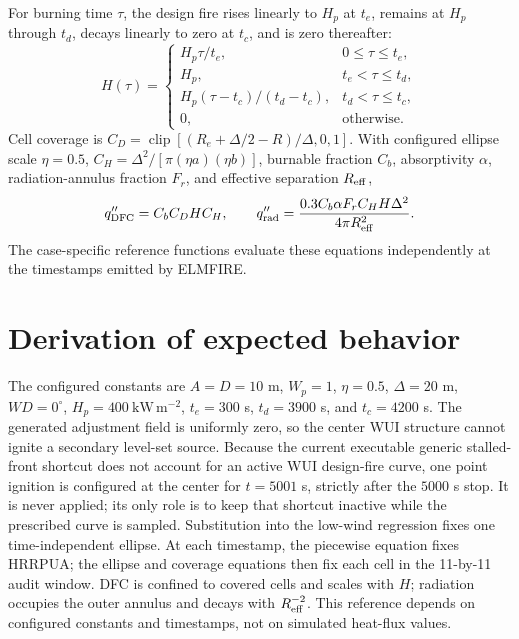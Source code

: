 For burning time \(\tau\), the design fire rises linearly to \(H_p\) at \(t_e\), remains at \(H_p\) through \(t_d\), decays linearly to zero at \(t_c\), and is zero thereafter:
\[
H(\tau)=
\begin{cases}
H_p\tau/t_e,&0\le\tau\le t_e,\\
H_p,&t_e<\tau\le t_d,\\
H_p(\tau-t_c)/(t_d-t_c),&t_d<\tau\le t_c,\\
0,&\text{otherwise}.
\end{cases}
\]
Cell coverage is \(C_D=\operatorname{clip}[(R_e+\Delta/2-R)/\Delta,0,1]\).
With configured ellipse scale \(\eta=0.5\), \(C_H=\Delta^2/[\pi(\eta a)(\eta b)]\), burnable fraction \(C_b\), absorptivity \(\alpha\), radiation-annulus fraction \(F_r\), and effective separation \(R_{\rm eff}\),
\[
 q''_{\mathrm{DFC}}=C_bC_DHC_H,\qquad
 q''_{\rm rad}=\frac{0.3C_b\alpha F_r C_HH\Delta^2}{4\pi R_{\rm eff}^2}.
\]
The case-specific reference functions evaluate these equations independently at the timestamps emitted by ELMFIRE.

\section{Derivation of expected behavior}

The configured constants are \(A=D=10\) m, \(W_p=1\), \(\eta=0.5\), \(\Delta=20\) m, \(WD=0^\circ\), \(H_p=400~\mathrm{kW\,m^{-2}}\), \(t_e=300\) s, \(t_d=3900\) s, and \(t_c=4200\) s. The generated adjustment field is uniformly zero, so the center WUI structure cannot ignite a secondary level-set source. Because the current executable generic stalled-front shortcut does not account for an active WUI design-fire curve, one point ignition is configured at the center for \(t=5001\) s, strictly after the \(5000\) s stop. It is never applied; its only role is to keep that shortcut inactive while the prescribed curve is sampled. Substitution into the low-wind regression fixes one time-independent ellipse. At each timestamp, the piecewise equation fixes HRRPUA; the ellipse and coverage equations then fix each cell in the 11-by-11 audit window. DFC is confined to covered cells and scales with \(H\); radiation occupies the outer annulus and decays with \(R_{\rm eff}^{-2}\). This reference depends on configured constants and timestamps, not on simulated heat-flux values.

